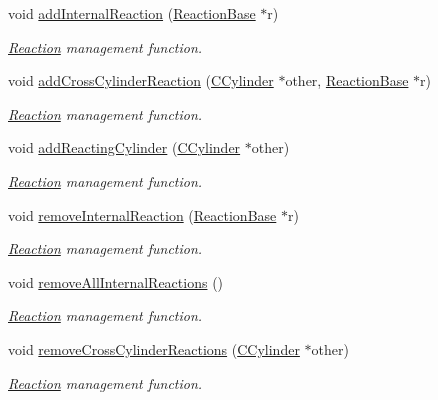 \begin{DoxyCompactItemize}
\item 
void \hyperlink{classCCylinder_a53bed608f1b287eca275e0833a1233f1}{add\+Internal\+Reaction} (\hyperlink{classReactionBase}{Reaction\+Base} $\ast$r)
\begin{DoxyCompactList}\small\item\em \hyperlink{classReaction}{Reaction} management function. \end{DoxyCompactList}\item 
void \hyperlink{classCCylinder_a5535278dcbc8498e3006b5176858bddd}{add\+Cross\+Cylinder\+Reaction} (\hyperlink{classCCylinder}{C\+Cylinder} $\ast$other, \hyperlink{classReactionBase}{Reaction\+Base} $\ast$r)
\begin{DoxyCompactList}\small\item\em \hyperlink{classReaction}{Reaction} management function. \end{DoxyCompactList}\item 
void \hyperlink{classCCylinder_adeb2d133a53137e281b3134bfba5a4db}{add\+Reacting\+Cylinder} (\hyperlink{classCCylinder}{C\+Cylinder} $\ast$other)
\begin{DoxyCompactList}\small\item\em \hyperlink{classReaction}{Reaction} management function. \end{DoxyCompactList}\item 
void \hyperlink{classCCylinder_a9ee95b562068b9ffbc6c3b989be7af5f}{remove\+Internal\+Reaction} (\hyperlink{classReactionBase}{Reaction\+Base} $\ast$r)
\begin{DoxyCompactList}\small\item\em \hyperlink{classReaction}{Reaction} management function. \end{DoxyCompactList}\item 
void \hyperlink{classCCylinder_ae35ab9042ad585fa7ea9ba32ecd6e60f}{remove\+All\+Internal\+Reactions} ()
\begin{DoxyCompactList}\small\item\em \hyperlink{classReaction}{Reaction} management function. \end{DoxyCompactList}\item 
void \hyperlink{classCCylinder_a4cb0c141bef0820e345b5e3c756fa163}{remove\+Cross\+Cylinder\+Reactions} (\hyperlink{classCCylinder}{C\+Cylinder} $\ast$other)
\begin{DoxyCompactList}\small\item\em \hyperlink{classReaction}{Reaction} management function. \end{DoxyCompactList}\item 

\end{DoxyCompactItemize}
